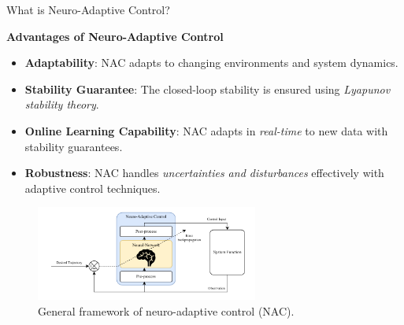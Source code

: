 \documentclass[8pt, aspectratio=169]{beamer}
\begin{document}
\begin{frame}{\insertsubsectionhead}{What is Neuro-Adaptive Control?}

  \textbf{Advantages of Neuro-Adaptive Control}
  \small{
    \begin{itemize}
      \item \textbf{Adaptability}: NAC adapts to changing environments and system dynamics.
      \item \textbf{Stability Guarantee}: The closed-loop stability is ensured using \textit{Lyapunov stability theory}.
      \item \textbf{Online Learning Capability}: NAC adapts in \textit{real-time} to new data with stability guarantees.
      \item \textbf{Robustness}: NAC handles \textit{uncertainties and disturbances} effectively with adaptive control techniques.
    \end{itemize}
  }
  
\begin{figure}
  \label{fig:general_framework}
  \includegraphics[width=0.65\textwidth]{figures/conv_nac.drawio.pdf}
  \caption{General framework of neuro-adaptive control (NAC).}
\end{figure}

\end{frame}
\end{document}
